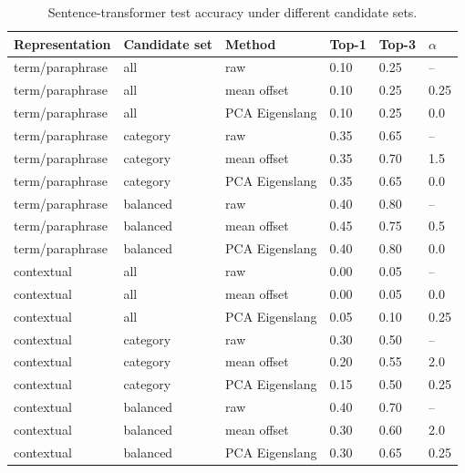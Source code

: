 \begin{table}
  \caption{Sentence-transformer test accuracy under different candidate sets.}
  \label{tab:candidate-results}
  \centering
  \begin{tabular}{llllll}
    \toprule
    Representation & Candidate set & Method & Top-1 & Top-3 & $\alpha$ \\
    \midrule
    term/paraphrase & all & raw & 0.10 & 0.25 & -- \\
    term/paraphrase & all & mean offset & 0.10 & 0.25 & 0.25 \\
    term/paraphrase & all & PCA Eigenslang & 0.10 & 0.25 & 0.0 \\
    term/paraphrase & category & raw & 0.35 & 0.65 & -- \\
    term/paraphrase & category & mean offset & 0.35 & 0.70 & 1.5 \\
    term/paraphrase & category & PCA Eigenslang & 0.35 & 0.65 & 0.0 \\
    term/paraphrase & balanced & raw & 0.40 & 0.80 & -- \\
    term/paraphrase & balanced & mean offset & 0.45 & 0.75 & 0.5 \\
    term/paraphrase & balanced & PCA Eigenslang & 0.40 & 0.80 & 0.0 \\
    contextual & all & raw & 0.00 & 0.05 & -- \\
    contextual & all & mean offset & 0.00 & 0.05 & 0.0 \\
    contextual & all & PCA Eigenslang & 0.05 & 0.10 & 0.25 \\
    contextual & category & raw & 0.30 & 0.50 & -- \\
    contextual & category & mean offset & 0.20 & 0.55 & 2.0 \\
    contextual & category & PCA Eigenslang & 0.15 & 0.50 & 0.25 \\
    contextual & balanced & raw & 0.40 & 0.70 & -- \\
    contextual & balanced & mean offset & 0.30 & 0.60 & 2.0 \\
    contextual & balanced & PCA Eigenslang & 0.30 & 0.65 & 0.25 \\
    \bottomrule
  \end{tabular}
\end{table}

